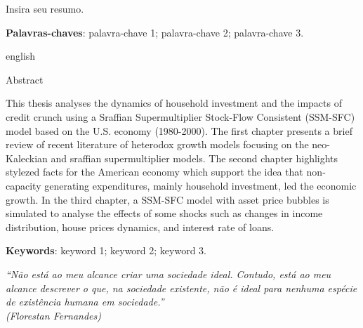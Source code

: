 \documentclass[
12pt,				%
openright,			%
oneside,			%
a4paper,		%
english,			%
brazil,				%
sumario=tradicional,
]{abntex2}
\begin{document}
%

\begin{resumo}

Insira seu resumo.

\lipsum[1]

\vspace{\onelineskip}

\noindent\textbf{Palavras-chaves}: palavra-chave 1; palavra-chave 2; palavra-chave 3.

\vspace{\onelineskip}
\vspace{\onelineskip}
\begin{otherlanguage*}{english}
	\begin{center}{\ABNTEXchapterfont\huge Abstract}\end{center}
	
	This thesis analyses the dynamics of household investment and the impacts of credit crunch using a Sraffian Supermultiplier Stock-Flow Consistent (SSM-SFC) model based on the U.S. economy (1980-2000). The first chapter presents a brief review of recent literature of heterodox growth models focusing on the neo-Kaleckian and sraffian supermultiplier models. The second chapter highlights stylezed facts for the American economy which support the idea that non‐capacity generating expenditures, mainly household investment, led the economic growth. In the third chapter, a SSM-SFC model with asset price bubbles is simulated to analyse the effects of some shocks such as  changes in income distribution, house prices dynamics,  and interest rate of loans.     
	
	\vspace{\onelineskip}
	
	\noindent\textbf{Keywords}: keyword 1; keyword 2; keyword 3. 
	
\end{otherlanguage*}
\end{resumo}

\begin{epigrafe}
	\vspace*{\fill}
	\begin{flushright}
		\textit{``Não está ao meu alcance criar uma sociedade ideal. Contudo, está ao meu alcance descrever o que, na sociedade existente, não é ideal para nenhuma espécie de existência humana em sociedade.''\\
			(Florestan Fernandes)}
	\end{flushright}
\end{epigrafe}
\newpage
\end{document}
